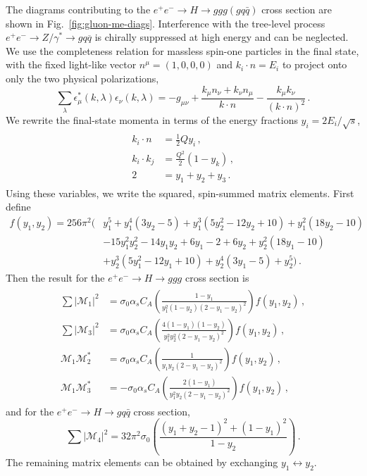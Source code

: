 \documentclass[letterpaper,11pt]{article}
\newcommand{\Fig}[1]{Fig.~\ref{#1}}
\begin{document}
The diagrams contributing to the $e^+e^-\rightarrow H \rightarrow ggg(gq\bar{q})$ cross section are shown in \Fig{fig:gluon-me-diags}. 
%
Interference with the tree-level process $e^+e^- \rightarrow Z/\gamma^* \rightarrow gq\overline{q}$ is chirally suppressed at high energy and can be neglected.
%
We use the completeness relation for massless spin-one particles in the final state, with the fixed light-like vector $n^\mu = (1,0,0,0)$ and $k_i\cdot n = E_i$ to project onto only the two physical polarizations,
\begin{equation}
\sum_{\lambda} \epsilon^*_\mu (k,\lambda) \epsilon_{\nu}(k,\lambda) = -g_{\mu \nu} + \frac{k_\mu n_\nu + k_\nu n_\mu}{k\cdot n} - \frac{k_\mu k_\nu}{(k\cdot n)^2}\,.
\end{equation}
We rewrite the final-state momenta in terms of the energy fractions $y_i = 2E_i/\sqrt{s}$, 
\begin{align}
\begin{split}
k_i \cdot n &= \frac{1}{2}Qy_i\,, \\
k_i \cdot k_j &= \frac{Q^2}{2}(1-y_k)\,, \\
2 &= y_1 + y_2 + y_3\,. 
\end{split}
\end{align}
Using these variables, we write the squared, spin-summed matrix elements.
%
First define
\begin{align}
\nonumber
f(y_1,y_2) = 256\pi^2 \bigg(& y_1^5 + y_1^4(3y_2-5) + y_1^3(5y_2^2 - 12y_2 + 10) + y_1^2(18y_2 - 10)\\ \nonumber
&- 15 y_1^2y_2^2 -14y_1y_2+ 6y_1 - 2 +6y_2 + y_2^2(18y_1-10)\\
& + y_2^3(5y_1^2 - 12y_1 + 10) + y_2^4(3y_1-5) + y_2^5\bigg) \,.
\end{align}
Then the result for the $e^+e^-\rightarrow H \rightarrow ggg$ cross section is
\begin{align}
\begin{split}
\sum \vert \mathcal{M}_1\vert^2 &=  \sigma_0 \alpha_s C_A\left(\frac{1-y_1}{y_1^2(1-y_2)(2-y_1-y_2)^2}\right)f(y_1,y_2)\,,\\
\sum \vert \mathcal{M}_3\vert^2 &= \sigma_0\alpha_s  C_A\left( \frac{4(1-y_1)(1-y_2)}{y_1^2y_2^2(2-y_1-y_2)^2}\right)f(y_1,y_2)\,,\\
%
\mathcal{M}_1\mathcal{M}_2^* &= \sigma_0 \alpha_s C_A \left(\frac{1 }{y_1y_2(2-y_1-y_2)^2}\right)f(y_1,y_2)\,,\\
%
\mathcal{M}_1\mathcal{M}_3^* &= -\sigma_0 \alpha_s C_A\left( \frac{2(1-y_1)}{y_1^2y_2(2-y_1-y_2)^2}\right)f(y_1,y_2)\,,
\end{split}
\end{align}
and for the $e^+e^-\rightarrow H\rightarrow gq\bar{q}$ cross section,
\begin{equation}
\sum \vert \mathcal{M}_4\vert^2 =32\pi^2 \sigma_0  \left(\frac{(y_1+y_2-1)^2+(1-y_1)^2}{1-y_2}\right) \,.
\end{equation}
The remaining matrix elements can be obtained by exchanging $y_1 \leftrightarrow y_2$. 
\end{document}
